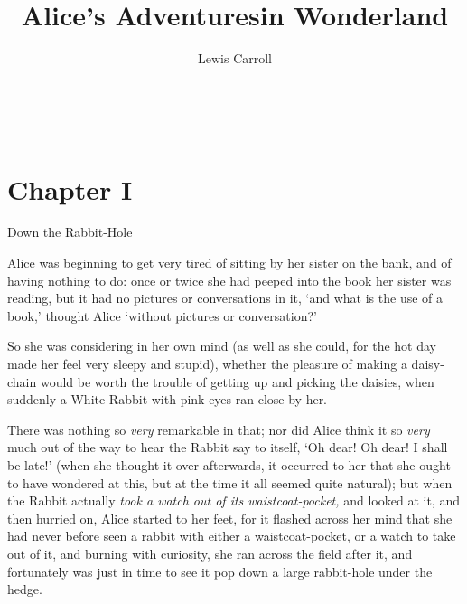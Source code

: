 

~\vskip 5cm
\title{Alice's Adventures}
\onelineskip
\title{in Wonderland}
\bigskip
\author{Lewis Carroll}

\vfill\break

\startcontent

\contents


\vfill\break

\chapter{Chapter I}{Down the Rabbit-Hole}

  Alice was beginning to get very tired of sitting by her sister
on the bank, and of having nothing to do:  once or twice she had
peeped into the book her sister was reading, but it had no
pictures or conversations in it, `and what is the use of a book,'
thought Alice `without pictures or conversation?'

  So she was considering in her own mind (as well as she could,
for the hot day made her feel very sleepy and stupid), whether
the pleasure of making a daisy-chain would be worth the trouble
of getting up and picking the daisies, when suddenly a White
Rabbit with pink eyes ran close by her.

  There was nothing so {\it very} remarkable in that; nor did Alice
think it so {\it very} much out of the way to hear the Rabbit say to
itself, `Oh dear!  Oh dear!  I shall be late!'  (when she thought
it over afterwards, it occurred to her that she ought to have
wondered at this, but at the time it all seemed quite natural);
but when the Rabbit actually {\it took a watch out of its waistcoat-pocket,}
and looked at it, and then hurried on, Alice started to
her feet, for it flashed across her mind that she had never
before seen a rabbit with either a waistcoat-pocket, or a watch to
take out of it, and burning with curiosity, she ran across the
field after it, and fortunately was just in time to see it pop
down a large rabbit-hole under the hedge.

